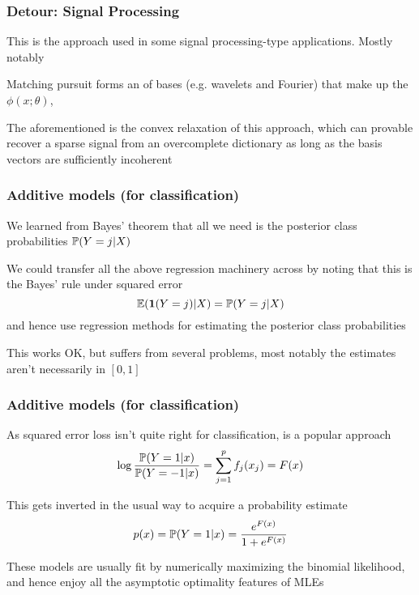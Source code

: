 \documentclass[12pt]{beamer}
\begin{document}
\begin{frame}[fragile]
\frametitle{Detour: Signal Processing}

\vsp
This is the approach used in some signal processing-type applications.  Mostly notably 


\vsp
Matching pursuit forms an  of bases (e.g. wavelets and Fourier) that make up the
$\phi(x;\theta)$,


\vsp
The aforementioned  is the convex relaxation of this approach, which can provable  recover
a sparse signal from an overcomplete dictionary as long as the basis vectors are sufficiently incoherent 



\end{frame}
\begin{frame}[fragile]
\frametitle{Additive models (for classification)}
We learned from Bayes' theorem that all we need is the posterior class probabilities $\P(Y = j | X)$

\vsp
We could transfer all the above regression machinery across by noting that this is the Bayes' rule under squared
error
\[
\E(\mathbf{1}(Y = j) | X) = \P(Y = j | X)
\]
and hence use regression methods for estimating the posterior class probabilities

\vsp
This works OK, but suffers from several problems, most notably the estimates aren't necessarily in $[0,1]$

\end{frame}


\begin{frame}[fragile]
\frametitle{Additive models (for classification)}
As squared error loss isn't quite right for classification,  is a popular approach
\[
\log \frac{\P(Y= 1| x)}{\P(Y = -1 | x)} = \sum_{j=1}^p f_j(x_j) = F(x)
\]

\vsp
This gets inverted in the usual way to acquire a probability estimate
\[
p(x) = \P(Y = 1|x) = \frac{e^{F(x)}}{1 + e^{F(x)}}
\]

\vsp
These models are usually fit by numerically maximizing the binomial likelihood, and hence
enjoy all the asymptotic optimality features of MLEs
\end{frame}
\end{document}
